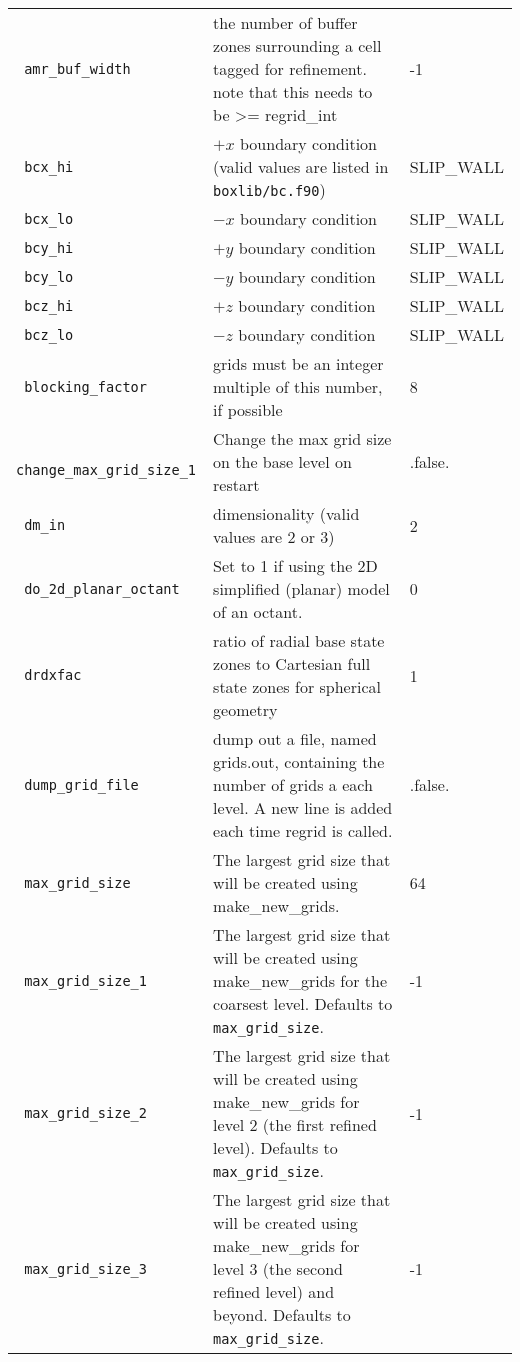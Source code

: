 \begin{landscape}
{\begin{center}
\begin{longtable}{|l|p{5.25in}|l|}
\rowcolor{tableShade}
\verb= amr_buf_width = &  the number of buffer zones surrounding a cell tagged for refinement. note that this needs to be >= regrid\_int & -1 \\
\verb= bcx_hi = &  $+x$ boundary condition (valid values are listed in {\tt  boxlib/bc.f90}) & SLIP\_WALL \\
\rowcolor{tableShade}
\verb= bcx_lo = &  $-x$ boundary condition & SLIP\_WALL \\
\verb= bcy_hi = &  $+y$ boundary condition & SLIP\_WALL \\
\rowcolor{tableShade}
\verb= bcy_lo = &  $-y$ boundary condition & SLIP\_WALL \\
\verb= bcz_hi = &  $+z$ boundary condition & SLIP\_WALL \\
\rowcolor{tableShade}
\verb= bcz_lo = &  $-z$ boundary condition & SLIP\_WALL \\
\verb= blocking_factor = &  grids must be an integer multiple of this number, if possible & 8 \\
\rowcolor{tableShade}
\verb= change_max_grid_size_1 = &  Change the max grid size on the base level on restart & .false. \\
\verb= dm_in = &  dimensionality (valid values are 2 or 3) & 2 \\
\rowcolor{tableShade}
\verb= do_2d_planar_octant = &  Set to 1 if using the 2D simplified (planar) model of an octant. & 0 \\
\verb= drdxfac = &  ratio of radial base state zones to Cartesian full state zones for spherical geometry & 1 \\
\rowcolor{tableShade}
\verb= dump_grid_file = &  dump out a file, named grids.out, containing the number of grids a each level. A new line is added each time regrid is called. & .false. \\
\verb= max_grid_size = &  The largest grid size that will be created using make\_new\_grids. & 64 \\
\rowcolor{tableShade}
\verb= max_grid_size_1 = &  The largest grid size that will be created using make\_new\_grids for the coarsest level.  Defaults to {\tt max\_grid\_size}. & -1 \\
\verb= max_grid_size_2 = &  The largest grid size that will be created using make\_new\_grids for level 2 (the first refined level).  Defaults to {\tt max\_grid\_size}. & -1 \\
\rowcolor{tableShade}
\verb= max_grid_size_3 = &  The largest grid size that will be created using make\_new\_grids for level 3 (the second refined level) and beyond.  Defaults to {\tt max\_grid\_size}. & -1 \\

\end{longtable}
\end{center}}
\end{landscape}
